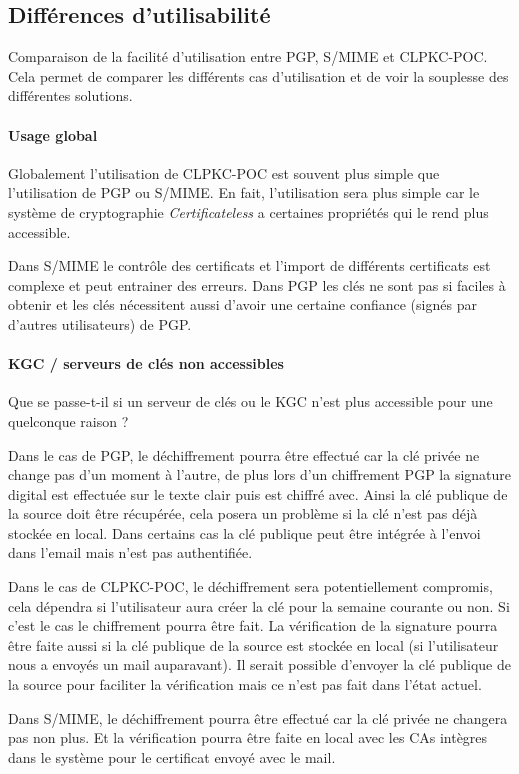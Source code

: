 \subsection{Différences d'utilisabilité}
Comparaison de la facilité d'utilisation entre PGP, S/MIME et CLPKC-POC. Cela permet de comparer les différents cas d'utilisation et de voir la souplesse des différentes solutions.

\paragraph*{Usage global}
Globalement l'utilisation de CLPKC-POC est souvent plus simple que l'utilisation de PGP ou S/MIME. En fait, l'utilisation sera plus simple car le système de cryptographie \textit{Certificateless} a certaines propriétés qui le rend plus accessible. 

Dans S/MIME le contrôle des certificats et l'import de différents certificats est complexe et peut entrainer des erreurs. Dans PGP les clés ne sont pas si faciles à obtenir et les clés nécessitent aussi d'avoir une certaine confiance (signés par d'autres utilisateurs) de PGP.
\paragraph*{KGC / serveurs de clés non accessibles}
Que se passe-t-il si un serveur de clés ou le KGC n'est plus accessible pour une quelconque raison ?

Dans le cas de PGP, le déchiffrement pourra être effectué car la clé privée ne change pas d'un moment à l'autre, de plus lors d'un chiffrement PGP la signature digital est effectuée sur le texte clair puis est chiffré avec. Ainsi la clé publique de la source doit être récupérée, cela posera un problème si la clé n'est pas déjà stockée en local. Dans certains cas la clé publique peut être intégrée à l'envoi dans l'email mais n'est pas authentifiée.

Dans le cas de CLPKC-POC, le déchiffrement sera potentiellement compromis, cela dépendra si l'utilisateur aura créer la clé pour la semaine courante ou non. Si c'est le cas le chiffrement pourra être fait. La vérification de la signature pourra être faite aussi si la clé publique de la source est stockée en local (si l'utilisateur nous a envoyés un mail auparavant). Il serait possible d'envoyer la clé publique de la source pour faciliter la vérification mais ce n'est pas fait dans l'état actuel.

Dans S/MIME, le déchiffrement pourra être effectué car la clé privée ne changera pas non plus. Et la vérification pourra être faite en local avec les CAs intègres dans le système pour le certificat envoyé avec le mail.
